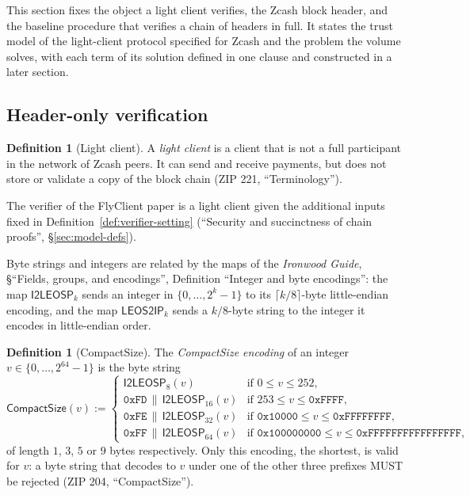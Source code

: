 \documentclass[11pt,a4paper]{article}
\theoremstyle{definition}
\newtheorem{definition}[theorem]{Definition}
\begin{document}
This section fixes the object a light client verifies, the Zcash block
header, and the baseline procedure that verifies a chain of headers in full.
It states the trust model of the light-client protocol specified for Zcash
and the problem the volume solves, with each term of its solution defined in
one clause and constructed in a later section.

\subsection{Header-only verification}\label{sec:problem-spv}

\begin{definition}[Light client]\label{def:light-client}
A \emph{light client} is a client that is not a full participant in the
network of Zcash peers. It can send and receive payments, but does not store
or validate a copy of the block chain (ZIP 221, ``Terminology'').
\end{definition}

The verifier of the FlyClient paper is a light client given the additional
inputs fixed in Definition~\ref{def:verifier-setting} (``Security and
succinctness of chain proofs'', \S\ref{sec:model-defs}).

Byte strings and integers are related by the maps of the \emph{Ironwood
Guide}, \S``Fields, groups, and encodings'', Definition ``Integer and byte
encodings'': the map $\mathsf{I2LEOSP}_k$ sends an integer in
$\{0, \dots, 2^k - 1\}$ to its $\lceil k/8 \rceil$-byte little-endian
encoding, and the map $\mathsf{LEOS2IP}_k$ sends a $k/8$-byte string to the
integer it encodes in little-endian order.

\begin{definition}[CompactSize]\label{def:compactsize}
The \emph{CompactSize encoding} of an integer
$v \in \{0, \dots, 2^{64} - 1\}$ is the byte string
\[
  \mathsf{CompactSize}(v) :=
  \begin{cases}
    \mathsf{I2LEOSP}_8(v)
      & \text{if } 0 \le v \le 252, \\
    \mathtt{0xFD} \,\|\, \mathsf{I2LEOSP}_{16}(v)
      & \text{if } 253 \le v \le \mathtt{0xFFFF}, \\
    \mathtt{0xFE} \,\|\, \mathsf{I2LEOSP}_{32}(v)
      & \text{if } \mathtt{0x10000} \le v \le \mathtt{0xFFFFFFFF}, \\
    \mathtt{0xFF} \,\|\, \mathsf{I2LEOSP}_{64}(v)
      & \text{if } \mathtt{0x100000000} \le v \le
        \mathtt{0xFFFFFFFFFFFFFFFF},
  \end{cases}
\]
of length $1$, $3$, $5$ or $9$ bytes respectively. Only this encoding, the
shortest, is valid for $v$: a byte string that decodes to $v$ under one of
the other three prefixes MUST be rejected (ZIP 204, ``CompactSize'').
\end{definition}
\end{document}
